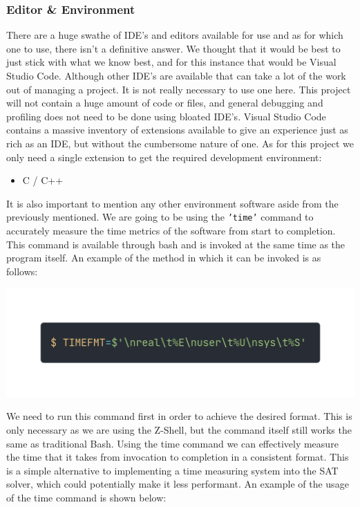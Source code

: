 \documentclass{article}
\begin{document}
\subsubsection{Editor \& Environment}
There are a huge swathe of IDE's and editors available for use and as for which one to use, there isn't a definitive answer. We thought that it would be best to just stick with what we know best, and for this instance that would be Visual Studio Code. Although other IDE's are available that can take a lot of the work out of managing a project. It is not really necessary to use one here. This project will not contain a huge amount of code or files, and general debugging and profiling does not need to be done using bloated IDE's. Visual Studio Code contains a massive inventory of extensions available to give an experience just as rich as an IDE, but without the cumbersome nature of one. As for this project we only need a single extension to get the required development environment:

\begin{itemize}
    \item C / C++
\end{itemize}

It is also important to mention any other environment software aside from the previously mentioned. We are going to be using the \texttt{'time'} command to accurately measure the time metrics of the software from start to completion. This command is available through bash and is invoked at the same time as the program itself. An example of the method in which it can be invoked is as follows:

\begin{center}
    \includegraphics[scale=0.2]{time_command_format.png}
\end{center}

We need to run this command first in order to achieve the desired format. This is only necessary as we are using the 
Z-Shell, but the command itself still works the same as traditional Bash. Using the time command we can effectively measure the time that it takes from invocation to completion in a consistent format. This is a simple alternative to implementing a time measuring system into the SAT solver, which could potentially make it less performant. An example of the usage of the time command is shown below:
\end{document}
